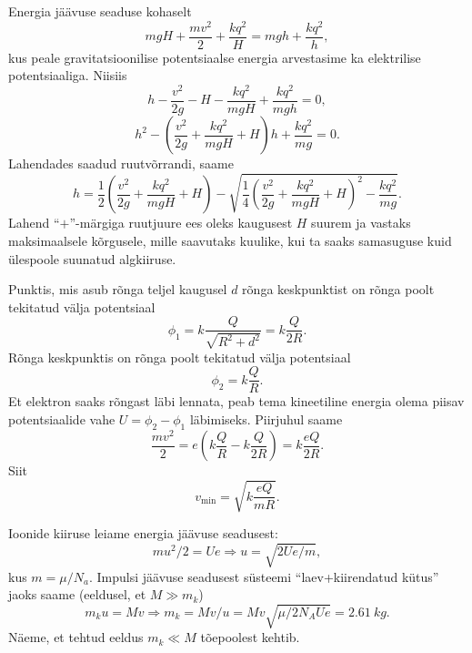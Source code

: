 \documentclass[10pt, twoside]{article}
\begin{document}
{%

\solu
Energia jäävuse seaduse kohaselt
\[
mgH + \frac{mv^2}{2} + \frac{kq^2}{H} = mgh + \frac{kq^2}{h},
\]
kus peale gravitatsioonilise potentsiaalse energia arvestasime ka elektrilise potentsiaaliga. Niisiis
\[
h-\frac{v^{2}}{2 g}-H-\frac{k q^{2}}{m g H}+\frac{k q^{2}}{m g h}=0,
\]
\[
h^{2}-\left(\frac{v^{2}}{2 g}+\frac{k q^{2}}{m g H}+H\right) h+\frac{k q^{2}}{m g}=0.
\]
Lahendades saadud ruutvõrrandi, saame
\[
h=\frac{1}{2}\left(\frac{v^{2}}{2 g}+\frac{k q^{2}}{m g H}+H\right)-\sqrt{\frac{1}{4}\left(\frac{v^{2}}{2 g}+\frac{k q^{2}}{m g H}+H\right)^{2}-\frac{k q^{2}}{m g}}.
\]
Lahend \enquote{$+$}-märgiga ruutjuure ees oleks kaugusest $H$ suurem ja vastaks maksimaalsele kõrgusele, mille saavutaks kuulike, kui ta saaks samasuguse kuid ülespoole suunatud algkiiruse.
\probend
\bigskip


\solu
Punktis, mis asub rõnga teljel kaugusel $d$ rõnga keskpunktist on rõnga poolt tekitatud välja potentsiaal
\[
\phi_{1}=k \frac{Q}{\sqrt{R^{2}+d^{2}}}=k \frac{Q}{2 R}.
\]
Rõnga keskpunktis on rõnga poolt tekitatud välja potentsiaal
\[
\phi_{2}=k \frac{Q}{R}.
\]
Et elektron saaks rõngast läbi lennata, peab tema kineetiline energia olema piisav
potentsiaalide vahe $U = \phi_2 - \phi_1$ läbimiseks. Piirjuhul saame
\[
\frac{m v^{2}}{2}=e\left(k \frac{Q}{R}-k \frac{Q}{2 R}\right)=k \frac{e Q}{2 R}.
\]
Siit
\[
v_{\min }=\sqrt{k \frac{e Q}{m R}}.
\]
\probend
\bigskip


\solu
Ioonide kiiruse leiame energia jäävuse seadusest:
$$mu^2/2=Ue \Rightarrow u=\sqrt{2Ue/m},$$
kus $m=\mu/N_a$.
Impulsi jäävuse seadusest süsteemi ``laev+kiirendatud kütus'' jaoks saame (eeldusel, et $M\gg m_k$)
$$m_ku=Mv \Rightarrow m_k=Mv/u=Mv\sqrt{\mu/2N_AUe}=\SI{2,61}{kg}.$$
Näeme, et tehtud eeldus $m_k\ll M$ tõepoolest kehtib.
\probend
\bigskip


}
\end{document}

